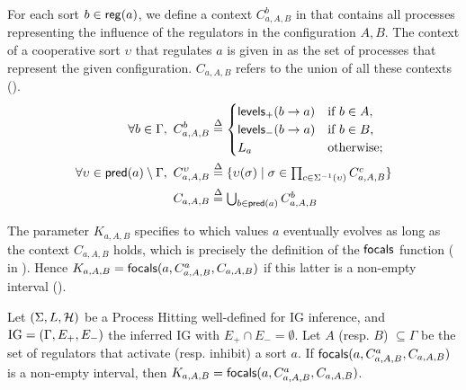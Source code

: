 For each sort $b \in \mathsf{reg}({a})$, we define a context $C^b_{a,A,B}$ in  that contains all processes representing the influence of the regulators in the configuration $A,B$.
The context of a cooperative sort $\upsilon$ that regulates $a$ is given in  as the set of processes that represent the given configuration.
$C_{a,A,B}$ refers to the union of all these contexts ().
\begin{align}
\label{eq:param_context}
\forall b\in\Gamma,~
C_{a,A,B}^b & \stackrel{\Delta}= \begin{cases}
\mathsf{levels}_+(b\rightarrow a) & \text{if $b \in A$,}\\
\mathsf{levels}_-(b\rightarrow a) & \text{if $b \in B$,}\\
L_a		& \text{otherwise;}\\
\end{cases}
\\
\label{eq:param_context_coop}
\forall \upsilon \in \mathsf{pred}(a)\setminus\Gamma,~
C_{a,A,B}^\upsilon & \stackrel{\Delta}= \{
\upsilon(\sigma) \mid \sigma \in \textstyle\prod_{c\in\Sigma^{-1}(\upsilon)}C_{a,A,B}^c \}
\\
C_{a,A,B} & \stackrel{\Delta}= \textstyle\bigcup_{b\in\mathsf{pred}(a)} C^b_{a,A,B}
\label{eq:K-ctx}
\end{align}

The parameter $K_{a,A,B}$ specifies to which values $a$ eventually evolves as long as the context
$C_{a,A,B}$ holds, which is precisely the definition of the $\mathsf{focals}$ function
( in ).
Hence $K_{a,A,B} = \mathsf{focals}(a,C^a_{a,A,B},C_{a,A,B})$ if this latter is a non-empty interval
().

\begin{theorem}
\label{thm:param_K}
Let $(\Sigma, L, \mathcal{H})$ be a Process Hitting well-defined for IG inference, and $\mathrm{IG} = (\Gamma,
E_+, E_-)$ the inferred IG with $E_+\cap E_-=\emptyset$.
Let $A$ (resp. $B$) $\subseteq \Gamma$ be the set of regulators that activate (resp. inhibit) a sort
$a$.
If $\mathsf{focals}(a,C^a_{a,A,B},C_{a,A,B})$ is a non-empty interval, 
	then $K_{a,A,B} = \mathsf{focals}(a, C^a_{a,A,B}, C_{a,A,B})$.
\end{theorem}

\begin{example*}
\end{example*}

